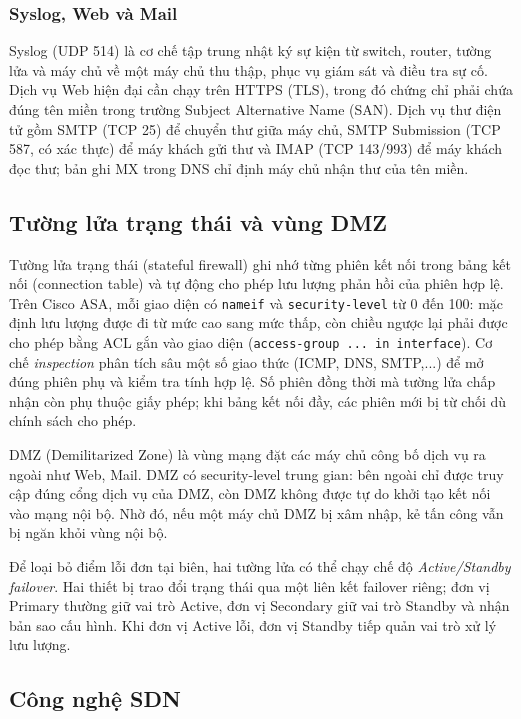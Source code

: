 \subsubsection{Syslog, Web và Mail}

Syslog (UDP 514) là cơ chế tập trung nhật ký sự kiện từ switch, router, tường lửa và máy chủ về một máy chủ thu thập, phục vụ giám sát và điều tra sự cố. Dịch vụ Web hiện đại cần chạy trên HTTPS (TLS), trong đó chứng chỉ phải chứa đúng tên miền trong trường Subject Alternative Name (SAN). Dịch vụ thư điện tử gồm SMTP (TCP 25) để chuyển thư giữa máy chủ, SMTP Submission (TCP 587, có xác thực) để máy khách gửi thư và IMAP (TCP 143/993) để máy khách đọc thư; bản ghi MX trong DNS chỉ định máy chủ nhận thư của tên miền.

\subsection{Tường lửa trạng thái và vùng DMZ}

Tường lửa trạng thái (stateful firewall) ghi nhớ từng phiên kết nối trong bảng kết nối (connection table) và tự động cho phép lưu lượng phản hồi của phiên hợp lệ. Trên Cisco ASA, mỗi giao diện có \texttt{nameif} và \texttt{security-level} từ 0 đến 100: mặc định lưu lượng được đi từ mức cao sang mức thấp, còn chiều ngược lại phải được cho phép bằng ACL gắn vào giao diện (\texttt{access-group ... in interface}). Cơ chế \textit{inspection} phân tích sâu một số giao thức (ICMP, DNS, SMTP,...) để mở đúng phiên phụ và kiểm tra tính hợp lệ. Số phiên đồng thời mà tường lửa chấp nhận còn phụ thuộc giấy phép; khi bảng kết nối đầy, các phiên mới bị từ chối dù chính sách cho phép.

DMZ (Demilitarized Zone) là vùng mạng đặt các máy chủ công bố dịch vụ ra ngoài như Web, Mail. DMZ có security-level trung gian: bên ngoài chỉ được truy cập đúng cổng dịch vụ của DMZ, còn DMZ không được tự do khởi tạo kết nối vào mạng nội bộ. Nhờ đó, nếu một máy chủ DMZ bị xâm nhập, kẻ tấn công vẫn bị ngăn khỏi vùng nội bộ.

Để loại bỏ điểm lỗi đơn tại biên, hai tường lửa có thể chạy chế độ \textit{Active/Standby failover}. Hai thiết bị trao đổi trạng thái qua một liên kết failover riêng; đơn vị Primary thường giữ vai trò Active, đơn vị Secondary giữ vai trò Standby và nhận bản sao cấu hình. Khi đơn vị Active lỗi, đơn vị Standby tiếp quản vai trò xử lý lưu lượng.

\subsection{Công nghệ SDN}

